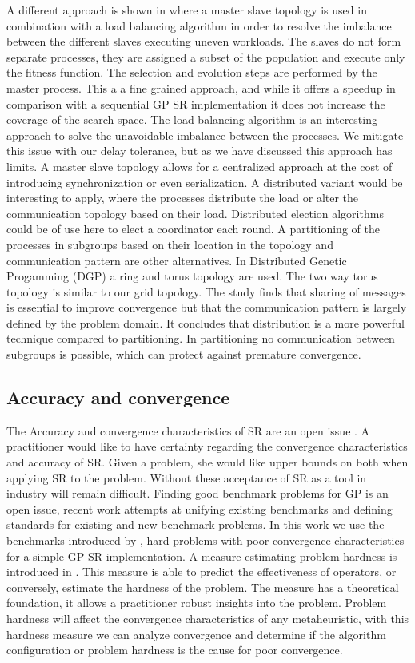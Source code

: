 A different approach is shown in \citep{DFGPSR} where a master slave topology is used in combination with a load balancing algorithm in order to resolve the imbalance between the different slaves executing uneven workloads. The slaves do not form separate processes, they are assigned a subset of the population and execute only the fitness function. The selection and evolution steps are performed by the master process. This a a fine grained approach, and while it offers a speedup in comparison with a sequential GP SR implementation it does not increase the coverage of the search space. The load balancing algorithm is an interesting approach to solve the unavoidable imbalance between the processes. We mitigate this issue with our delay tolerance, but as we have discussed this approach has limits. A master slave topology allows for a centralized approach at the cost of introducing synchronization or even serialization. A distributed variant would be interesting to apply, where the processes distribute the load or alter the communication topology based on their load. Distributed election algorithms could be of use here to elect a coordinator each round. A partitioning of the processes in subgroups based on their location in the topology and communication pattern are other alternatives.
In Distributed Genetic Progamming (DGP) \cite{DGP} a ring and torus topology are used. The two way torus topology is similar to our grid topology. The study finds that sharing of messages is essential to improve convergence but that the communication pattern is largely defined by the problem domain. It concludes that distribution is a more powerful technique compared to partitioning. In partitioning no communication between subgroups is possible, which can protect against premature convergence.

\subsection{Accuracy and convergence}
The Accuracy and convergence characteristics of SR are an open issue \citep{SRAccuracy, SRAccur, SRBaseline}. A practitioner would like to have certainty regarding the convergence characteristics and accuracy of SR. Given a problem, she would like upper bounds on both when applying SR to the problem. Without these acceptance of SR as a tool in industry will remain difficult.
Finding good benchmark problems for GP is an open issue, recent work \citep{GPBenchmarks} attempts at unifying existing benchmarks and defining standards for existing and new benchmark problems. In this work we use the benchmarks introduced by \cite{SRAccuracy}, hard problems with poor convergence characteristics for a simple GP SR implementation.
A measure estimating problem hardness is introduced in \citep{GPHardness}. This measure is able to predict the effectiveness of operators, or conversely, estimate the hardness of the problem. The measure has a theoretical foundation, it allows a practitioner robust insights into the problem. Problem hardness will affect the convergence characteristics of any metaheuristic, with this hardness measure we can analyze convergence and determine if the algorithm configuration or problem hardness is the cause for poor convergence.
